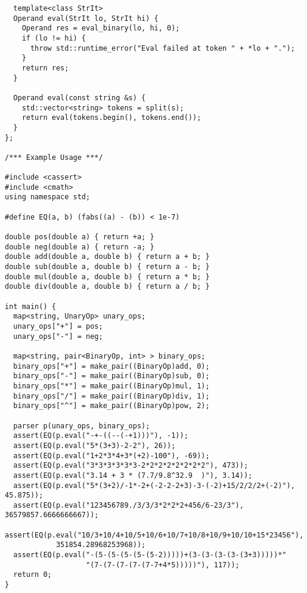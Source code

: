 \begin{lstlisting}
  template<class StrIt>
  Operand eval(StrIt lo, StrIt hi) {
    Operand res = eval_binary(lo, hi, 0);
    if (lo != hi) {
      throw std::runtime_error("Eval failed at token " + *lo + ".");
    }
    return res;
  }

  Operand eval(const string &s) {
    std::vector<string> tokens = split(s);
    return eval(tokens.begin(), tokens.end());
  }
};

/*** Example Usage ***/

#include <cassert>
#include <cmath>
using namespace std;

#define EQ(a, b) (fabs((a) - (b)) < 1e-7)

double pos(double a) { return +a; }
double neg(double a) { return -a; }
double add(double a, double b) { return a + b; }
double sub(double a, double b) { return a - b; }
double mul(double a, double b) { return a * b; }
double div(double a, double b) { return a / b; }

int main() {
  map<string, UnaryOp> unary_ops;
  unary_ops["+"] = pos;
  unary_ops["-"] = neg;

  map<string, pair<BinaryOp, int> > binary_ops;
  binary_ops["+"] = make_pair((BinaryOp)add, 0);
  binary_ops["-"] = make_pair((BinaryOp)sub, 0);
  binary_ops["*"] = make_pair((BinaryOp)mul, 1);
  binary_ops["/"] = make_pair((BinaryOp)div, 1);
  binary_ops["^"] = make_pair((BinaryOp)pow, 2);

  parser p(unary_ops, binary_ops);
  assert(EQ(p.eval("-+-((--(-+1)))"), -1));
  assert(EQ(p.eval("5*(3+3)-2-2"), 26));
  assert(EQ(p.eval("1+2*3*4+3*(+2)-100"), -69));
  assert(EQ(p.eval("3*3*3*3*3*3-2*2*2*2*2*2*2*2"), 473));
  assert(EQ(p.eval("3.14 + 3 * (7.7/9.8^32.9  )"), 3.14));
  assert(EQ(p.eval("5*(3+2)/-1*-2+(-2-2-2+3)-3-(-2)+15/2/2/2+(-2)"), 45.875));
  assert(EQ(p.eval("123456789./3/3/3*2*2*2+456/6-23/3"), 36579857.6666666667));
  assert(EQ(p.eval("10/3+10/4+10/5+10/6+10/7+10/8+10/9+10/10+15*23456"),
            351854.28968253968));
  assert(EQ(p.eval("-(5-(5-(5-(5-(5-2)))))+(3-(3-(3-(3-(3+3)))))*"
                   "(7-(7-(7-(7-(7-7+4*5)))))"), 117));
  return 0;
}
\end{lstlisting}
